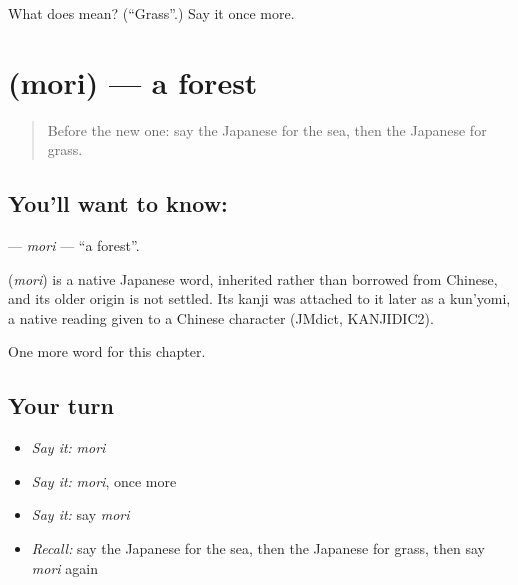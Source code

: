 \begin{tcolorbox}[breakable,colback=teal!4,colframe=teal!35!black,title={Before you move on}]
What does  mean? (\textquotedblleft{}Grass\textquotedblright{}.) Say it once more.
\end{tcolorbox}
\section[\texorpdfstring{\ja{もり} (mori)}{もり (mori)}]{ (mori) — a forest}

\label{lesson:JA-C42-mori}



\begin{quote}
Before the new one: say the Japanese for the sea, then the Japanese for grass.
\end{quote}

\subsection*{You'll want to know: }
\textbf{} — \emph{mori} — \textquotedblleft{}a forest\textquotedblright{}.

\begin{cousinweb}
\textbf{} (\emph{mori}) is a native Japanese word, inherited rather than borrowed from Chinese, and its older origin is not settled. Its kanji was attached to it later as a kun'yomi, a native reading given to a Chinese character (JMdict, KANJIDIC2).
\end{cousinweb}

\begin{grammarlens}[title={What you've built}]
One more word for this chapter.
\end{grammarlens}

\subsection*{Your turn}
\begin{itemize}
\raggedright
  \item \emph{Say it:} \emph{mori}
  \item \emph{Say it:} \emph{mori}, once more
  \item \emph{Say it:} say \emph{mori}
  \item \emph{Recall:} say the Japanese for the sea, then the Japanese for grass, then say \emph{mori} again
\end{itemize}


